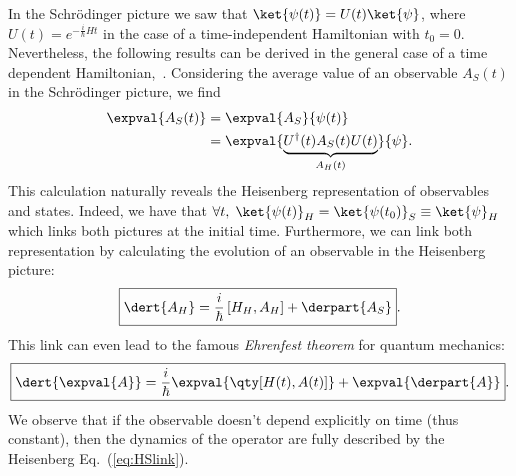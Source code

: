 In the Schrödinger picture we saw that $\ket{\psi(t)}=U(t)\ket{\psi}$, where $U(t)=e^{-\frac{i}{\hbar}Ht}$ in the case of a time-independent Hamiltonian with $t_0=0$. Nevertheless, the following results can be derived in the general case of a time dependent Hamiltonian,~\cite{Breuer}. Considering the average value of an observable $A_S(t)$ in the Schrödinger picture, we find
\begin{align}
    \expval{A_S(t)} &= \expval{A_S}{\psi(t)}\nonumber\\
    &= \expval{\underbrace{U^\dagger(t)A_S(t)U(t)}_{A_H(t)}}{\psi}.
\end{align}
This calculation naturally reveals the Heisenberg representation of observables and states. Indeed, we have that $\forall t,\;\ket{\psi(t)}_H=\ket{\psi(t_0)}_S\equiv\ket{\psi}_H$ which links both pictures at the initial time. Furthermore, we can link both representation by calculating the evolution of an observable in the Heisenberg picture:
\begin{equation}
    \boxed{\dert{A_H} = \frac{i}{\hbar}\left[H_{H},A_{H}\right] + \derpart{A_S}\label{eq:HSlink}}.
\end{equation}
This link can even lead to the famous \textit{Ehrenfest theorem} for quantum mechanics:
\begin{equation}
    \boxed{\dert{\expval{A}}=\frac{i}{\hbar}\expval{\qty[H(t),A(t)]}+\expval{\derpart{A}}}.
\end{equation}
We observe that if the observable doesn't depend explicitly on time (thus constant), then the dynamics of the operator are fully described by the Heisenberg Eq.~(\ref{eq:HSlink}).


